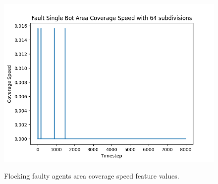 \documentclass[../../Thesis.tex]{subfiles}
\begin{document}
\begin{figure}[H]
{							\includegraphics[scale=0.22]{../../Images/Experiments/flocking_15_East_6_percent_rotating_fault_after_1500_gain_1000/Fault_Single_Bot_Area_Coverage_Speed_with_64_subdivisions.png}
					}
					\thinspace
					\caption{Flocking faulty agents area coverage speed feature values.}
					\label{fig:flocking_faulty_area_coverage_speed}
				\end{figure}
			
\end{document}
